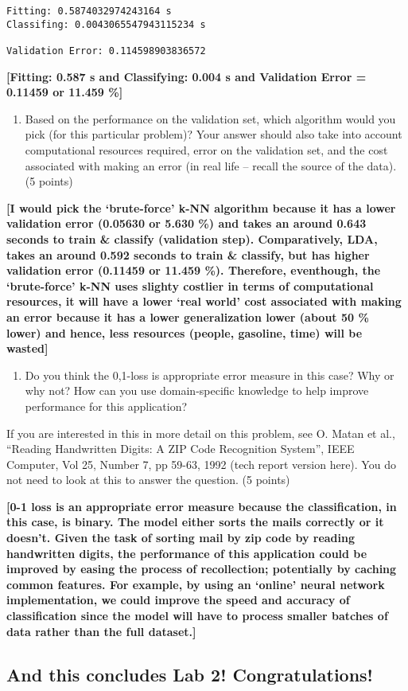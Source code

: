 \documentclass[11pt]{article}
\providecommand{\tightlist}{%
      \setlength{\itemsep}{0pt}\setlength{\parskip}{0pt}}
\begin{document}
    \begin{Verbatim}[commandchars=\\\{\}]
Fitting: 0.5874032974243164 s
Classifing: 0.0043065547943115234 s

Validation Error: 0.114598903836572
    \end{Verbatim}

    \textbf{{[}Fitting: 0.587 s and Classifying: 0.004 s and Validation
Error = 0.11459 or 11.459 \%{]}}

    \begin{enumerate}
\def\labelenumi{(\arabic{enumi})}
\tightlist
\item
  Based on the performance on the validation set, which algorithm would
  you pick (for this particular problem)? Your answer should also take
  into account computational resources required, error on the validation
  set, and the cost associated with making an error (in real life --
  recall the source of the data). (5 points)
\end{enumerate}

    \textbf{{[}I would pick the `brute-force' k-NN algorithm because it has
a lower validation error (0.05630 or 5.630 \%) and takes an around 0.643
seconds to train \& classify (validation step). Comparatively, LDA,
takes an around 0.592 seconds to train \& classify, but has higher
validation error (0.11459 or 11.459 \%). Therefore, eventhough, the
`brute-force' k-NN uses slighty costlier in terms of computational
resources, it will have a lower `real world' cost associated with making
an error because it has a lower generalization lower (about 50 \% lower)
and hence, less resources (people, gasoline, time) will be wasted{]}}

    \begin{enumerate}
\def\labelenumi{(\arabic{enumi})}
\setcounter{enumi}{1}
\tightlist
\item
  Do you think the 0,1-loss is appropriate error measure in this case?
  Why or why not? How can you use domain-specific knowledge to help
  improve performance for this application?
\end{enumerate}

If you are interested in this in more detail on this problem, see O.
Matan et al., ``Reading Handwritten Digits: A ZIP Code Recognition
System'', IEEE Computer, Vol 25, Number 7, pp 59-63, 1992 (tech report
version here). You do not need to look at this to answer the question.
(5 points)

    \textbf{{[}0-1 loss is an appropriate error measure because the
classification, in this case, is binary. The model either sorts the
mails correctly or it doesn't. Given the task of sorting mail by zip
code by reading handwritten digits, the performance of this application
could be improved by easing the process of recollection; potentially by
caching common features. For example, by using an `online' neural
network implementation, we could improve the speed and accuracy of
classification since the model will have to process smaller batches of
data rather than the full dataset.{]}}

    \hypertarget{and-this-concludes-lab-2-congratulations}{%
\subsection{And this concludes Lab 2!
Congratulations!}\label{and-this-concludes-lab-2-congratulations}}


    
    
    
\end{document}
